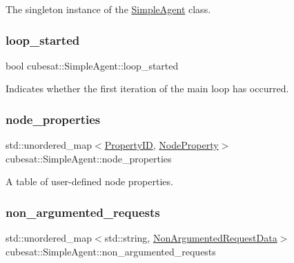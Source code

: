 The singleton instance of the \hyperlink{classcubesat_1_1SimpleAgent}{Simple\+Agent} class. 

\mbox{\label{classcubesat_1_1SimpleAgent_a016886076c10e7c0ba79df9e524b6636}} 
\subsubsection{\texorpdfstring{loop\+\_\+started}{loop\_started}}
{\footnotesize\ttfamily bool cubesat\+::\+Simple\+Agent\+::loop\+\_\+started\hspace{0.3cm}{\ttfamily [protected]}}



Indicates whether the first iteration of the main loop has occurred. 

\mbox{\label{classcubesat_1_1SimpleAgent_afaa70738662df0c6a3d0905a3768321e}} 
\subsubsection{\texorpdfstring{node\+\_\+properties}{node\_properties}}
{\footnotesize\ttfamily std\+::unordered\+\_\+map$<$\hyperlink{namespacecubesat_ab5c769503b8a77bc90a47ca8705f2f86}{Property\+ID}, \hyperlink{structcubesat_1_1SimpleAgent_1_1NodeProperty}{Node\+Property}$>$ cubesat\+::\+Simple\+Agent\+::node\+\_\+properties\hspace{0.3cm}{\ttfamily [protected]}}



A table of user-\/defined node properties. 

\mbox{\label{classcubesat_1_1SimpleAgent_aa8d5ffd8623da8252448b78b8391ee43}} 
\subsubsection{\texorpdfstring{non\+\_\+argumented\+\_\+requests}{non\_argumented\_requests}}
{\footnotesize\ttfamily std\+::unordered\+\_\+map$<$std\+::string, \hyperlink{structcubesat_1_1SimpleAgent_1_1NonArgumentedRequestData}{Non\+Argumented\+Request\+Data}$>$ cubesat\+::\+Simple\+Agent\+::non\+\_\+argumented\+\_\+requests\hspace{0.3cm}{\ttfamily [protected]}}



